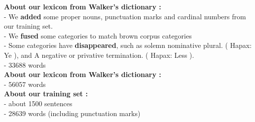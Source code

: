 \begin{center}
\textbf{ About our lexicon from Walker's dictionary :}\\[1mm]
	
- We \textbf{added} some proper nouns, punctuation marks and cardinal numbers from our training set.\\
- We \textbf{fused} some categories to match brown corpus categories\\
- Some categories have \textbf{disappeared}, such as solemn nominative plural. ( Hapax: Ye ), and A negative or privative termination. ( Hapax: Less ).\\
- 33688 words\\[2mm]

\textbf{About our lexicon from Walker's dictionary :}\\[1mm]

- 56057 words\\[2mm]

\textbf{About our training set :}\\[1mm]
- about 1500 sentences\\
- 28639 words (including punctuation marks)

\end{center}
